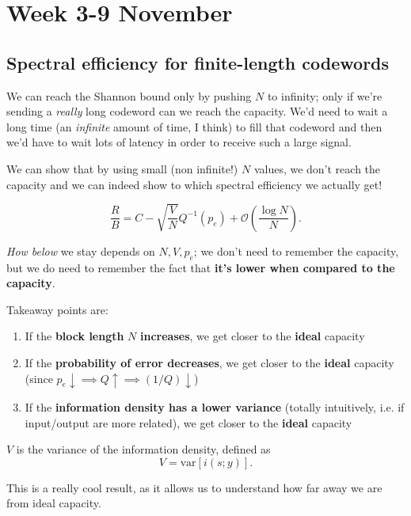 \documentclass[a4paper, 12pt]{book}
\begin{document}
\setcounter{chapter}{2}
\chapter[ ]{Week 3-9 November}
\section{Spectral efficiency for finite-length codewords}

We can reach the Shannon bound only by pushing $N$ to infinity; only if we're sending a \textit{really} long codeword can we reach the capacity. We'd need to wait a long time (an \textit{infinite} amount of time, I think) to fill that codeword and then we'd have to wait lots of latency in order to receive such a large signal.

We can show that by using small (non infinite!) $N$ values, we don't reach the capacity and we can indeed show to which spectral efficiency we actually get!

\begin{equation}
\frac{R}{B} = C - \sqrt{\frac{V}{N}} Q^{-1}(p_e) + \mathcal{O}\left(\frac{\log N}{N}\right) \text{.} \tag{1.143}
\end{equation}

\textit{How below} we stay depends on $N, V, p_e$; we don't need to remember the capacity, but we do need to remember the fact that \textbf{it's lower when compared to the capacity}.

Takeaway points are:
\begin{enumerate}[label=\textcolor{gray}{\arabic*.}]
    \item If the \textbf{block length} $N$ \textbf{increases}, we get closer to the \textbf{ideal} capacity
    \item If the \textbf{probability of error decreases}, we get closer to the \textbf{ideal} capacity (since $p_e \downarrow \implies Q \uparrow \implies (1/Q) \downarrow$)
    \item If the \textbf{information density has a lower variance} (totally intuitively, i.e. if input/output are more related), we get closer to the \textbf{ideal} capacity
\end{enumerate}

$V$ is the variance of the information density, defined as
\begin{equation}
V = \text{var}[i(s;y)] \text{.} \tag{1.144}
\end{equation}

This is a really cool result, as it allows us to understand how far away we are from ideal capacity.
\end{document}
